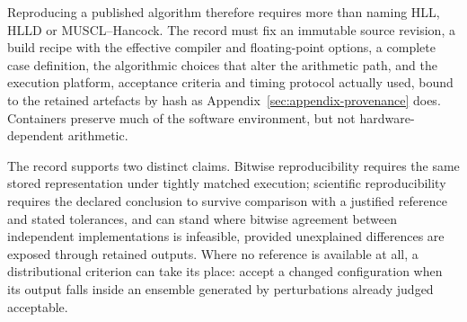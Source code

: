 Reproducing a published algorithm therefore requires more than naming HLL, HLLD
or MUSCL--Hancock. The record must fix an immutable source revision, a build
recipe with the effective compiler and floating-point options, a complete case
definition, the algorithmic choices that alter the arithmetic path, and the
execution platform, acceptance criteria and timing protocol actually used, bound
to the retained artefacts by hash
\citep{plesser2018reproducibility,sandveEtAl2013reproducible} as
Appendix~\ref{sec:appendix-provenance} does. Containers preserve much of the
software environment, but not hardware-dependent arithmetic.

The record supports two distinct claims. Bitwise reproducibility requires the
same stored representation under tightly matched execution; scientific
reproducibility requires the declared conclusion to survive comparison with a
justified reference and stated tolerances, and can stand where bitwise
agreement between independent implementations is infeasible, provided
unexplained differences are exposed through retained outputs. Where no
reference is available at all, a distributional criterion can take its place:
\citet{bakerEtAl2015ensemble} accept a changed configuration when its output
falls inside an ensemble generated by perturbations already judged acceptable.

